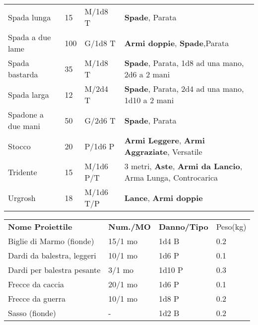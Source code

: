 \documentclass[landscape,10pt,a4paper]{article}
\begin{document}
\begin{multicols}{2}
{\begin{tabularx}{0.95\textwidth}{llll}
	Spada lunga& 15 & M/1d8 T&\textbf{Spade}, Parata\\
	Spada a due lame& 100& G/1d8 T& \textbf{Armi doppie}, \textbf{Spade},Parata\\
	Spada bastarda& 35 & M/1d8 T&\textbf{Spade}, Parata, 1d8 ad una mano, 2d6 a 2 mani\\
	Spada larga& 12 & M/2d4 T&\textbf{Spade}, Parata, 2d4 ad una mano, 1d10 a 2 mani\\
	Spadone a due mani& 50 & G/2d6 T&\textbf{Spade}, Parata\\
	Stocco& 20 & P/1d6 P& \textbf{Armi Leggere}, \textbf{Armi Aggraziate}, Versatile\\
	Tridente& 15 & M/1d6 P/T& 3 metri, \textbf{Aste}, \textbf{Armi da Lancio}, Arma Lunga, Controcarica\\
	Urgrosh& 18 & M/1d6 T/P& \textbf{Lance}, \textbf{Armi doppie}
\end{tabularx}}
	



	
	\begin{tabular}{llll}
		\textbf{Nome Proiettile}   & \textbf{Num./MO} & \textbf{Danno/Tipo} & Peso(kg) \\
	Biglie di Marmo (fionde)   & 15/1 mo                    & 1d4 B               & 0.2      \\
	Dardi da balestra, leggeri & 10/1 mo                    & 1d6 P               & 0.1      \\
	Dardi per balestra pesante & 3/1 mo                     & 1d10 P              & 0.3      \\
	Frecce da caccia           & 20/1 mo                    & 1d6 P               & 0.1      \\
	Frecce da guerra           & 10/1 mo                    & 1d8 P               & 0.2      \\
	Sasso (fionde)             & -                          & 1d2 B               & 0.2      \\
	\end{tabular}
	




\end{multicols}
\end{document}
